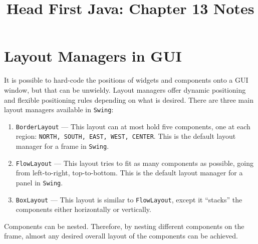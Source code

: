 \documentclass{tufte-handout}
\title{Head First Java: Chapter 13 Notes}
\begin{document}
    \maketitle

    \section*{Layout Managers in GUI}
    It is possible to hard-code the positions of widgets and components onto a GUI window, but that can be unwieldy. Layout managers offer dynamic positioning and flexible positioning rules depending on what is desired. There are three main layout managers available in \texttt{Swing}:

    \begin{enumerate}
        \item \texttt{BorderLayout} --- This layout can at most hold five components, one at each region: \texttt{NORTH, SOUTH, EAST, WEST, CENTER}. This is the default layout manager for a frame in \texttt{Swing}.
        \item \texttt{FlowLayout} --- This layout tries to fit as many components as possible, going from left-to-right, top-to-bottom. This is the default layout manager for a panel in \texttt{Swing}.
        \item \texttt{BoxLayout} --- This layout is similar to \texttt{FlowLayout}, except it ``stacks'' the components either horizontally or vertically.
    \end{enumerate}

    Components can be nested. Therefore, by nesting different components on the frame, almost any desired overall layout of the components can be achieved.
\end{document}
